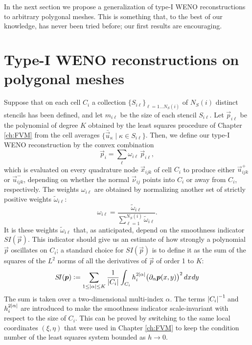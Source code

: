 In the next section we propose a generalization of type-I WENO reconstructions
to arbitrary polygonal meshes. This is something that, to the best of our
knowledge, has never been tried before; our first results are encouraging.

\section{Type-I WENO reconstructions on polygonal meshes}
Suppose that on each cell $C_i$ a collection
$\{S_{i\ell}\}_{\ell = 1 \dots N_S(i)}$ of $N_S(i)$ distinct stencils
has been defined, and let $m_{i\ell}$ be the size of each stencil $S_{i\ell}$.
Let $\vec{p}_{i\ell}$ be the polynomial of degree $K$ obtained by
the least squares procedure of Chapter \ref{ch:FVM} from the cell averages
$\{\bar{\vec{u}}_\kappa \mid \kappa \in S_{i\ell}\}$.
Then, we define our type-I WENO reconstruction by the convex combination
\begin{equation} \label{eq:WENO}
\vec{p}_i = \sum_{\ell} \omega_{i\ell} \, \vec{p}_{i\ell},
\end{equation}
which is evaluated on every quadrature node $\vec{x}_{ijk}$ of cell $C_i$
to produce either $\vec{u}_{ijk}^+$ or $\vec{u}_{ijk}^-$, depending on whether
the normal $\vec{\nu}_{ij}$ points into $C_i$ or away from $C_i$, respectively.
The weights $\omega_{i\ell}$ are obtained by normalizing another set
of strictly positive weights $\tilde{\omega}_{i\ell}$:
\[
\omega_{i\ell} = \frac{\tilde{\omega}_{i\ell}}
                      {\sum_{\ell=1}^{N_S(i)} \tilde{\omega}_{i\ell}}.
\]
It is these weights $\tilde{\omega}_{i\ell}$ that, as anticipated,
depend on the smoothness indicator $S\!I(\vec{p})$. This indicator should give
us an estimate of how strongly a polynomial $\vec{p}$ oscillates on $C_i$;
a standard choice for $S\!I(\vec{p})$ is to define it as the sum of the squares
of the $L^2$ norms of all the derivatives of $\vec{p}$ of order 1 to $K$:
\[
S\!I(\bm{p}) \vcentcolon= \sum_{1 \leq \left\lvert\alpha\right\rvert \leq K} \frac{1}{\left\lvert C_i\right\rvert}
	\int_{C_i} h_i^{2\left\lvert\alpha\right\rvert} \bigl(\partial_\alpha \bm{p}(x,y)\bigr)^2 \, dx \:\! dy
\]
The sum is taken over a two-dimensional multi-index $\alpha$.
The terms $\left\lvert C_i\right\rvert^{-1}\!$ and $h_i^{2\left\lvert\alpha\right\rvert}$ are introduced
to make the smoothness indicator scale-invariant with respect to the
size of $C_i$.
This can be proved by switching to the same local coordinates $(\xi,\eta)$
that were used in Chapter \ref{ch:FVM} to keep the condition number
of the least squares system bounded as $h \to 0$.


